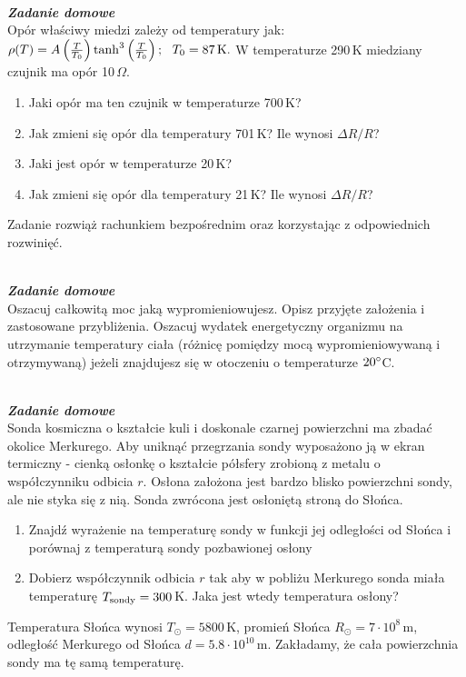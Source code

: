 \documentclass[11pt,a4paper]{article}
\newcounter{zaddom}\newcommand{\zaddom}[1][]{\addtocounter{zaddom}{1} ~\\  {\bf \emph{Zadanie domowe \arabic{zaddom} #1 }} \\}
\begin{document}
\zaddom
Opór właściwy miedzi zależy od temperatury jak:
$ \rho(T) = 
  A \left(\frac{T}{T_0}\right) \tanh^3 \left(\frac{T}{T_0}\right);
  ~~ T_0 = 87\,\rm{K}. 
$
W temperaturze 290\,K miedziany czujnik ma opór 10\,$\Omega$. 
\begin{enumerate}
\item Jaki opór ma ten czujnik w temperaturze 700\,K? 
\item Jak zmieni się opór dla temperatury 701\,K? Ile wynosi $\Delta R/R$? 
\item Jaki jest opór w temperaturze 20\,K?
\item Jak zmieni się opór dla temperatury 21\,K? Ile wynosi  $\Delta R/R$?
\end{enumerate}
Zadanie rozwiąż rachunkiem bezpośrednim oraz korzystając z odpowiednich rozwinięć.

\vskip 10pt

\zaddom
Oszacuj całkowitą moc jaką wypromieniowujesz. Opisz przyjęte założenia i zastosowane przybliżenia. Oszacuj
wydatek energetyczny organizmu na utrzymanie temperatury ciała (różnicę pomiędzy mocą wypromieniowywaną
i otrzymywaną) jeżeli znajdujesz się w otoczeniu o temperaturze $20\degree$C.
\vskip 10pt

\zaddom
Sonda kosmiczna o kształcie kuli i doskonale czarnej powierzchni ma zbadać okolice Merkurego. Aby uniknąć
przegrzania sondy wyposażono ją w ekran termiczny - cienką osłonkę o kształcie półsfery zrobioną z metalu
o współczynniku odbicia $r$. Osłona założona jest bardzo blisko powierzchni sondy, ale nie styka się z nią. Sonda
zwrócona jest osłoniętą stroną do Słońca.
\begin{enumerate}
\item Znajdź wyrażenie na temperaturę sondy w funkcji jej odległości od Słońca i porównaj z temperaturą sondy
pozbawionej osłony
\item Dobierz współczynnik odbicia $r$ tak aby w pobliżu Merkurego sonda miała temperaturę $T_{\rm sondy}= 300$\,K. 
Jaka jest wtedy temperatura osłony?
\end{enumerate}
Temperatura Słońca wynosi $T_\odot= 5800$\,K, promień Słońca $R_\odot = 7 \cdot 10^8$\,m, 
odległość Merkurego od Słońca $d = 5.8 \cdot 10^{10}$\,m. 
Zakładamy, że cała powierzchnia sondy ma tę samą temperaturę.
\vskip 10pt
\end{document}
